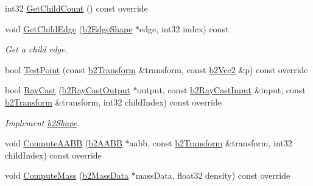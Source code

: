 \begin{DoxyCompactItemize}
int32 \mbox{\hyperlink{classb2ChainShape_a4d4fd8f5386a30f35b10d1b2848dbe54}{Get\+Child\+Count}} () const override
\item 
\mbox{\label{classb2ChainShape_abfe7f836d3c32dc06b920df61a74f412}} 
void \mbox{\hyperlink{classb2ChainShape_abfe7f836d3c32dc06b920df61a74f412}{Get\+Child\+Edge}} (\mbox{\hyperlink{classb2EdgeShape}{b2\+Edge\+Shape}} $\ast$edge, int32 index) const
\begin{DoxyCompactList}\small\item\em Get a child edge. \end{DoxyCompactList}\item 
bool \mbox{\hyperlink{classb2ChainShape_afd03c8679f18f9962a6c76bde629c62a}{Test\+Point}} (const \mbox{\hyperlink{structb2Transform}{b2\+Transform}} \&transform, const \mbox{\hyperlink{structb2Vec2}{b2\+Vec2}} \&p) const override
\item 
\mbox{\label{classb2ChainShape_add9e88f7f90b32ae75738cfb042ef532}} 
bool \mbox{\hyperlink{classb2ChainShape_add9e88f7f90b32ae75738cfb042ef532}{Ray\+Cast}} (\mbox{\hyperlink{structb2RayCastOutput}{b2\+Ray\+Cast\+Output}} $\ast$output, const \mbox{\hyperlink{structb2RayCastInput}{b2\+Ray\+Cast\+Input}} \&input, const \mbox{\hyperlink{structb2Transform}{b2\+Transform}} \&transform, int32 child\+Index) const override
\begin{DoxyCompactList}\small\item\em Implement \mbox{\hyperlink{classb2Shape}{b2\+Shape}}. \end{DoxyCompactList}\item 
void \mbox{\hyperlink{classb2ChainShape_ae1d7470ce8d32e92d27c149ab45f5468}{Compute\+A\+A\+BB}} (\mbox{\hyperlink{structb2AABB}{b2\+A\+A\+BB}} $\ast$aabb, const \mbox{\hyperlink{structb2Transform}{b2\+Transform}} \&transform, int32 child\+Index) const override
\item 
void \mbox{\hyperlink{classb2ChainShape_aad3671d6eab61f6b26e2f1b6ac50bb98}{Compute\+Mass}} (\mbox{\hyperlink{structb2MassData}{b2\+Mass\+Data}} $\ast$mass\+Data, float32 density) const override
\end{DoxyCompactItemize}
